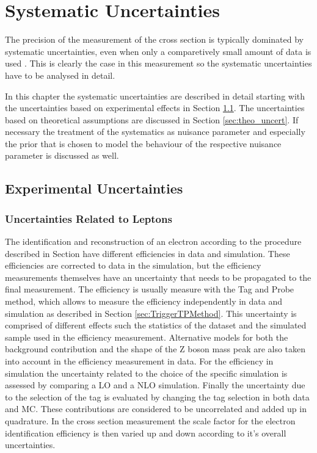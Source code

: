 
\chapter{Systematic Uncertainties}
\label{sec:syst_uncert}

The precision of the measurement of the \ttbar cross section is typically dominated by systematic uncertainties,
even when only a comparetively small amount of data is used . This is clearly the case in this
measurement so the systematic uncertainties have to be analysed in detail.

In this chapter the systematic uncertainties are described in detail starting with the uncertainties based on experimental effects in Section \ref{sec:exp_uncert}.
The uncertainties based on theoretical assumptions are discussed in Section \ref{sec:theo_uncert}. If necessary the treatment of the systematics as nuisance
parameter and especially the prior that is chosen to model the behaviour of the respective nuisance parameter is discussed as well.


\section{Experimental Uncertainties}
\label{sec:exp_uncert}

\subsection{Uncertainties Related to Leptons}

The identification and reconstruction of an electron according to the procedure described in Section  have different efficiencies in data and simulation.
These efficiencies are corrected to data in the simulation, but the efficiency measurements themselves have an uncertainty that needs to be propagated to the final measurement.
The efficiency is usually measure with the Tag and Probe method, which allows to measure the efficiency independently in data and simulation as described in Section \ref{sec:TriggerTPMethod}.
This uncertainty is comprised of different effects such the statistics of the dataset and the simulated sample used in the efficiency measurement. Alternative models for both the background contribution
and the shape of the Z boson mass peak are also taken into account in the efficiency measurement in data. For the efficiency in simulation the uncertainty related to the choice of the specific simulation is assessed by comparing a LO and a NLO simulation.
Finally the uncertainty due to the selection of the tag is evaluated by changing the tag selection in both data and MC.
These contributions are considered to be uncorrelated and added up in quadrature. 
In the cross section measurement the scale factor for the electron identification efficiency is then varied up and down according to it's overall uncertainties.


